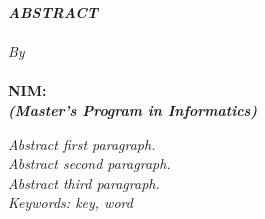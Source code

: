 \clearpage
{}

\begin{spacing}{1}
\begin{center}
  \textbf{\large \MakeUppercase{\emph{Abstract}}} \\[2em]

  \textbf{\large \MakeUppercase{\emph{\TitleEnglish}}} \\[2em]

  \normalsize \normalfont \textit{By}\\
  \large \bfseries \AuthorName\\
  NIM:~\uppercase{\AuthorNIM}\\
  \textit{(Master's Program in Informatics)}\\[3em]
\end{center}

\emph{Abstract first paragraph.}\\

\emph{Abstract second paragraph.}\\

\emph{Abstract third paragraph.}\\

\noindent \emph{Keywords: key, word}
\end{spacing}
